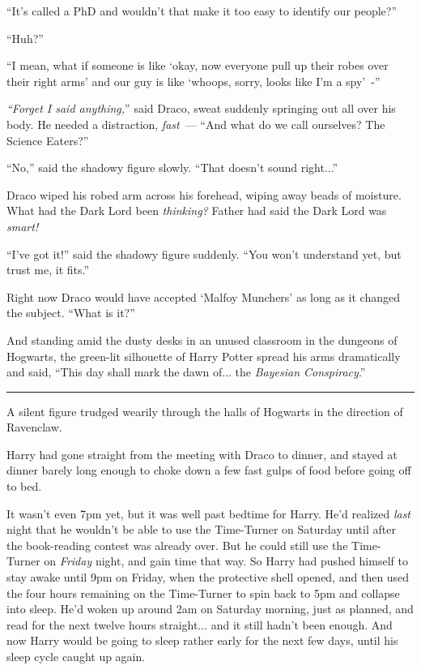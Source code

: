 ``It's called a PhD and wouldn't that make it too easy to identify our people?''

``Huh?''

``I mean, what if someone is like `okay, now everyone pull up their robes over their right arms' and our guy is like `whoops, sorry, looks like I'm a spy'~-''

\emph{``Forget I said anything,}'' said Draco, sweat suddenly springing out all over his body. He needed a distraction, \emph{fast}~--- ``And what do we call ourselves? The Science Eaters?''

``No,'' said the shadowy figure slowly. ``That doesn't sound right...''

Draco wiped his robed arm across his forehead, wiping away beads of moisture. What had the Dark Lord been \emph{thinking?} Father had said the Dark Lord was \emph{smart!}

``I've got it!'' said the shadowy figure suddenly. ``You won't understand yet, but trust me, it fits.''

Right now Draco would have accepted `Malfoy Munchers' as long as it changed the subject. ``What is it?''

And standing amid the dusty desks in an unused classroom in the dungeons of Hogwarts, the green-lit silhouette of Harry Potter spread his arms dramatically and said, ``This day shall mark the dawn of... the \emph{Bayesian Conspiracy}.''

\begin{center}\rule{3in}{0.4pt}\end{center}

A silent figure trudged wearily through the halls of Hogwarts in the direction of Ravenclaw.

Harry had gone straight from the meeting with Draco to dinner, and stayed at dinner barely long enough to choke down a few fast gulps of food before going off to bed.

It wasn't even 7pm yet, but it was well past bedtime for Harry. He'd realized \emph{last} night that he wouldn't be able to use the Time-Turner on Saturday until after the book-reading contest was already over. But he could still use the Time-Turner on \emph{Friday} night, and gain time that way. So Harry had pushed himself to stay awake until 9pm on Friday, when the protective shell opened, and then used the four hours remaining on the Time-Turner to spin back to 5pm and collapse into sleep. He'd woken up around 2am on Saturday morning, just as planned, and read for the next twelve hours straight... and it still hadn't been enough. And now Harry would be going to sleep rather early for the next few days, until his sleep cycle caught up again.

